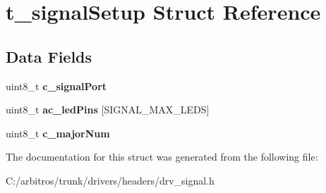 \hypertarget{structt__signal_setup}{\section{t\-\_\-signal\-Setup Struct Reference}
\label{structt__signal_setup}
}
\subsection*{Data Fields}
\begin{DoxyCompactItemize}
\item 
\hypertarget{structt__signal_setup_af86ceff59c114aae4c7c767e0dde8632}{uint8\-\_\-t {\bfseries c\-\_\-signal\-Port}}\label{structt__signal_setup_af86ceff59c114aae4c7c767e0dde8632}

\item 
\hypertarget{structt__signal_setup_a1384b15b1062ab123f76726b7bf78cfc}{uint8\-\_\-t {\bfseries ac\-\_\-led\-Pins} \mbox{[}S\-I\-G\-N\-A\-L\-\_\-\-M\-A\-X\-\_\-\-L\-E\-D\-S\mbox{]}}\label{structt__signal_setup_a1384b15b1062ab123f76726b7bf78cfc}

\item 
\hypertarget{structt__signal_setup_afba9106eb2fa769623759a1b529f884e}{uint8\-\_\-t {\bfseries c\-\_\-major\-Num}}\label{structt__signal_setup_afba9106eb2fa769623759a1b529f884e}

\end{DoxyCompactItemize}


The documentation for this struct was generated from the following file\-:\begin{DoxyCompactItemize}
\item 
C\-:/arbitros/trunk/drivers/headers/drv\-\_\-signal.\-h\end{DoxyCompactItemize}
